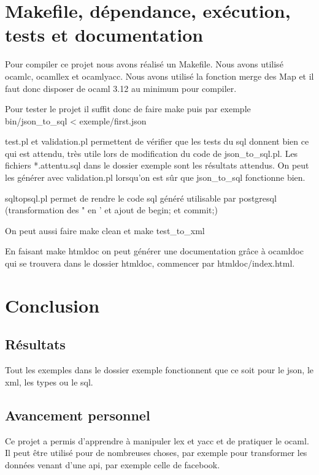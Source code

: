 \documentclass{report}
\begin{document}
\chapter{Makefile, dépendance, exécution, tests et documentation}
\par
Pour compiler ce projet nous avons réalisé un Makefile. Nous avons utilisé ocamlc, ocamllex et ocamlyacc. Nous avons utilisé la fonction merge des Map et il faut donc disposer de ocaml 3.12 au minimum pour compiler.
\par
Pour tester le projet il suffit donc de faire make puis par exemple bin/json\_to\_sql < exemple/first.json
\par
test.pl et validation.pl permettent de vérifier que les tests du sql donnent bien ce qui est attendu, très utile lors de modification du code de json\_to\_sql.pl. Les fichiers *.attentu.sql dans le dossier exemple sont les résultats attendus. On peut les générer avec validation.pl lorsqu'on est sûr que json\_to\_sql fonctionne bien.
\par
sqltopsql.pl permet de rendre le code sql généré utilisable par postgresql (transformation des " en ' et ajout de begin; et commit;)
\par
On peut aussi faire make clean et make test\_to\_xml
\par
En faisant make htmldoc on peut générer une documentation grâce à ocamldoc qui se trouvera dans le dossier htmldoc, commencer par htmldoc/index.html.


\chapter{Conclusion}
\section{Résultats}
Tout les exemples dans le dossier exemple fonctionnent que ce soit pour le json, le xml, les types ou le sql.
\section{Avancement personnel}
\par
Ce projet a permis d'apprendre à manipuler lex et yacc et de pratiquer le ocaml. Il peut être utilisé pour de nombreuses choses, par exemple pour transformer les données venant d'une api, par exemple celle de facebook.
\end{document}
